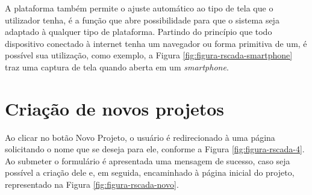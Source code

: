 A plataforma também permite o ajuste automático ao tipo de tela que o utilizador tenha, é a função que abre possibilidade para que o sistema seja adaptado à qualquer tipo de plataforma. Partindo do princípio que todo dispositivo conectado à internet tenha um navegador ou forma primitiva de um, é possível sua utilização, como exemplo, a Figura \ref{fig:figura-rscada-smartphone} traz uma captura de tela quando aberta em um \textit{smartphone}.

    	\begin{figure}[!h]
    	\end{figure}
    	
\section{Criação de novos projetos}
\label{sec:criacao-projetos}
Ao clicar no botão Novo Projeto, o usuário é redirecionado à uma página solicitando o nome que se deseja para ele, conforme a Figura \ref{fig:figura-rscada-4}. Ao submeter o formulário é apresentada uma mensagem de sucesso, caso seja possível a criação dele e, em seguida, encaminhado à página inicial do projeto, representado na Figura \ref{fig:figura-rscada-novo}. 

        \begin{figure}[!h]
    	\end{figure}
    	
